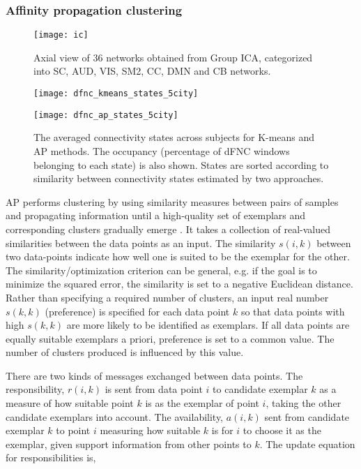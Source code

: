\documentclass{article}
\begin{document}
\subsubsection{Affinity propagation clustering}
\label{sec:Affinity}

\begin{figure}
  \centering
  \centerline{\texttt{[image: ic]}}
  \caption{Axial view of $36$ networks obtained from Group \ac{ICA}, categorized into \acf{SC}, \acf{AUD}, \acf{VIS}, \acf{SM2}, \acf{CC}, \acf{DMN} and \acf{CB} networks.}
  \label{fig:IC}
\end{figure}

\begin{figure*}
  \centering
  \centerline{\texttt{[image: dfnc\_kmeans\_states\_5city]}}
  \centerline{\texttt{[image: dfnc\_ap\_states\_5city]}}
  \caption{The averaged connectivity states across subjects for K-means and \ac{AP} methods. The occupancy (percentage of \ac{dFNC} windows belonging to each state) is also shown. States are sorted according to similarity between connectivity states estimated by two approaches.}
  \label{fig:states}
\end{figure*}

\ac{AP} performs clustering by using similarity measures between pairs of samples and propagating information until a high-quality set of exemplars and corresponding clusters gradually emerge \cite{frey_clustering_2007}. It takes a collection of real-valued similarities between the data points as an input. The similarity $s(i,k)$ between two data-points indicate how well one is suited to be the exemplar for the other. The similarity/optimization criterion can be general, e.g. if the goal is to minimize the squared error, the similarity is set to a negative Euclidean distance. Rather than specifying a required number of clusters, an input real number $s(k,k)$ (preference) is specified for each data point $k$ so that data points with high $s(k,k)$ are more likely to be identified as exemplars. If all data points are equally suitable exemplars a priori, preference is set to a common value. The number of clusters produced is influenced by this value.

There are two kinds of messages exchanged between data points. The responsibility, $r(i,k)$ is sent from data point $i$ to candidate exemplar $k$ as a measure of how suitable point $k$ is as the exemplar of point $i$, taking the other candidate exemplars into account. The availability, $a(i,k)$ sent from candidate exemplar $k$ to point $i$ measuring how suitable $k$ is for $i$ to choose it as the exemplar, given support information from other points to $k$. The update equation for responsibilities is,
\end{document}
